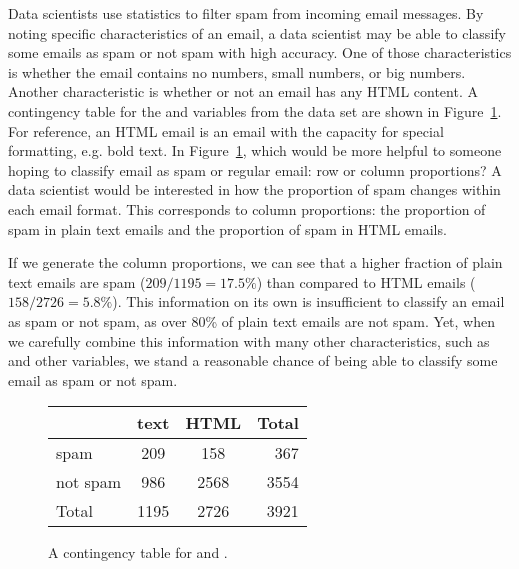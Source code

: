 \begin{example}{
    Data scientists use statistics to filter spam from incoming
    email messages.
    By noting specific characteristics of an email,
    a data scientist may be able to classify some emails as spam
    or not spam with high accuracy.
    One of those characteristics is whether the email
    contains no numbers, small numbers, or big numbers.
    Another characteristic is whether or not an email
    has any HTML content.
    A contingency table for the  and 
    variables from the  data set are shown in
    Figure~\ref{emailSpamHTMLTableTotals}.
    For reference, an HTML email is an email with the capacity
    for special formatting, e.g. bold text.
    In Figure~\ref{emailSpamHTMLTableTotals},
    which would be more helpful to someone hoping to classify
    email as spam or regular email: row or column proportions?}
  \label{weighingRowColumnProportions}
  A data scientist would be interested in how the proportion
  of spam changes within each email format.
  This corresponds to column proportions:
  the proportion of spam in plain text emails
  and the proportion of spam in HTML emails.

  If we generate the column proportions, we can see
  that a higher fraction of plain text emails are
  spam ($209/1195 = 17.5\%$)
  than compared to HTML emails ($158/2726 = 5.8\%$).
  This information on its own is insufficient to classify
  an email as spam or not spam, as over 80\% of plain text
  emails are not spam.
  Yet, when we carefully combine this information with many
  other characteristics, such as  and other variables,
  we stand a reasonable chance of being able to classify some
  email as spam or not spam.
\end{example}

\begin{figure}[ht]
\centering
\begin{tabular}{l cc r}
  \hline
  & text & HTML & Total \\ 
  \hline
  spam & 209 & 158 & 367 \\ 
  not spam & 986 & 2568 & 3554 \\ 
  \hline
  Total & 1195 & 2726 & 3921 \\
  \hline
\end{tabular}
\caption{A contingency table for  and .}
\label{emailSpamHTMLTableTotals}
\end{figure}

